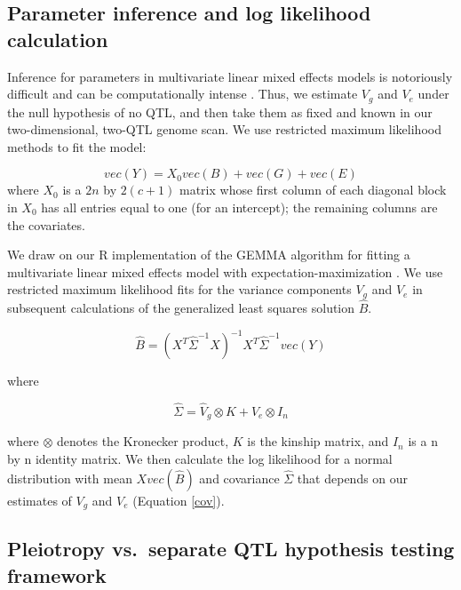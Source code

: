 \documentclass[12pt,twoside, lineno]{gsajnl}
\begin{document}
\subsection{Parameter inference and log likelihood calculation}

Inference for parameters in multivariate linear mixed effects models
is notoriously difficult and can be computationally intense
\citep{meyer1989restricted,meyer1991estimating}. Thus, we estimate
$V_g$ and $V_e$ under the null hypothesis of no QTL, and then take
them as fixed and known in our two-dimensional, two-QTL genome scan.
We use restricted maximum likelihood methods to fit the
model:

\begin{equation}
vec(Y) = X_0vec(B) + vec(G) + vec(E)
\label{model}
\end{equation}
where $X_0$ is a $2n$ by $2(c + 1)$ matrix whose first column of each
diagonal block in $X_0$ has all entries equal to one (for an intercept); the remaining
columns are the covariates.

We draw on our R implementation \citep{gemma2} of the
GEMMA algorithm for fitting a multivariate linear mixed effects model
with expectation-maximization \citep{zhou2014efficient}. We use
restricted maximum likelihood fits for the variance components $V_g$
and $V_e$ in subsequent calculations of the generalized least squares
solution $\hat B$.

\begin{equation}
    \hat B = (X^T\hat\Sigma^{-1}X)^{-1}X^T\hat\Sigma^{-1}vec(Y)
\end{equation}

\noindent where

\begin{equation}
    \hat\Sigma = \hat V_g \otimes K + \hat V_e \otimes I_n
    \label{cov}
\end{equation}

\noindent where $\otimes$ denotes the Kronecker product, $K$ is the
kinship matrix, and $I_n$ is a n by n
identity matrix. We then calculate the log likelihood for a normal
distribution with mean $X vec(\hat B)$ and covariance $\hat \Sigma$
that depends on our estimates of $V_g$ and $V_e$ (Equation \ref{cov}).

\subsection{Pleiotropy vs.\ separate QTL hypothesis testing framework}
\end{document}

